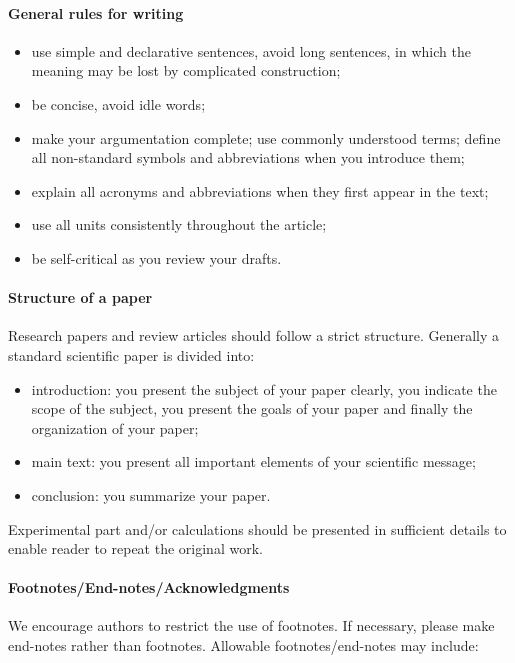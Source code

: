 \paragraph{General rules for writing}
\begin{itemize}
\item use simple and declarative sentences, avoid long sentences, in which the meaning may be lost by complicated construction;
\item be concise, avoid idle words;
\item make your argumentation complete; use commonly understood terms; define all non-standard symbols and abbreviations when you introduce them;
\item explain all acronyms and abbreviations when they first appear in the text;
\item use all units consistently throughout the article;
\item be self-critical as you review your drafts.
\end{itemize}

\paragraph{Structure of a paper}
    Research papers and review articles should follow a strict structure. Generally a standard scientific paper is divided into:
\begin{itemize}
\item introduction: you present the subject of your paper clearly, you indicate the scope of the subject, you present the goals of your paper and finally the organization of your paper;
\item main text: you present all important elements of your scientific message;
\item conclusion: you summarize your paper.
\end{itemize}


    Experimental part and/or calculations should be presented in sufficient details to enable reader to repeat the original work.



\paragraph{Footnotes/End-notes/Acknowledgments}
We encourage authors to restrict the use of footnotes. If necessary, please make end-notes rather than footnotes. Allowable footnotes/end-notes may include:

